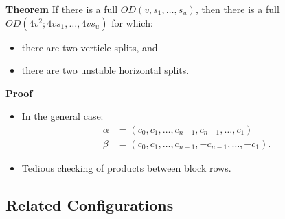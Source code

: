 \documentclass{beamer}
\begin{document}
\begin{frame}

  \begin{block}{{\bf Theorem} \cite[][]{split-od}}
    If there is a full $OD(v,s_1,\dots,s_u)$, then there is a full $OD(4v^2; 4vs_1, \dots, 4vs_u)$ for which:
    \begin{itemize}
    \item there are two verticle splits, and
    \item there are two unstable horizontal splits.
    \end{itemize}
  \end{block}

  \begin{block}{{\bf Proof}}
    \begin{itemize}
    \item In the general case:
      \begin{align*}
        \alpha &= (c_0, c_1, \dots, c_{n-1},c_{n-1},\dots,c_1) \\
        \beta &= (c_0, c_1, \dots, c_{n-1},-c_{n-1},\dots,-c_1).
      \end{align*}
    \item Tedious checking of products between block rows.
    \end{itemize}
  \end{block}
  
\end{frame}


\subsection{Related Configurations}





\end{document}
